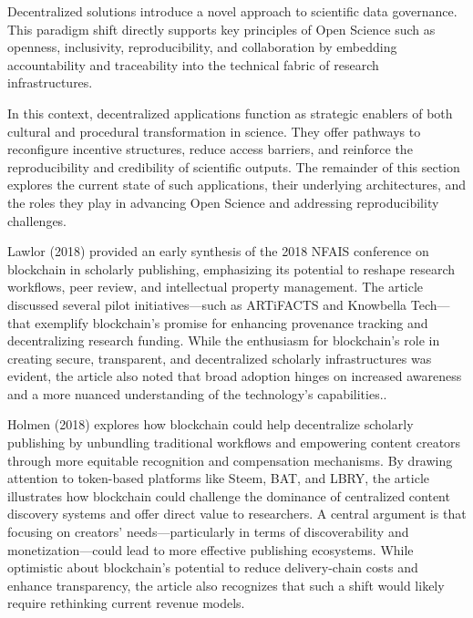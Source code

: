 \documentclass{article}
\begin{document}
Decentralized solutions introduce a novel approach to scientific data governance. This paradigm shift directly supports key principles of Open Science such as openness, inclusivity, reproducibility, and collaboration by embedding accountability and traceability into the technical fabric of research infrastructures.

In this context, decentralized applications function as strategic enablers of both cultural and procedural transformation in science. They offer pathways to reconfigure incentive structures, reduce access barriers, and reinforce the reproducibility and credibility of scientific outputs. The remainder of this section explores the current state of such applications, their underlying architectures, and the roles they play in advancing Open Science and addressing reproducibility challenges.


Lawlor (2018) provided an early synthesis of the 2018 NFAIS conference on blockchain in scholarly publishing, emphasizing its potential to reshape research workflows, peer review, and intellectual property management. The article discussed several pilot initiatives—such as ARTiFACTS and Knowbella Tech—that exemplify blockchain’s promise for enhancing provenance tracking and decentralizing research funding. While the enthusiasm for blockchain's role in creating secure, transparent, and decentralized scholarly infrastructures was evident, the article also noted that broad adoption hinges on increased awareness and a more nuanced understanding of the technology's capabilities..


Holmen (2018) explores how blockchain could help decentralize scholarly publishing by unbundling traditional workflows and empowering content creators through more equitable recognition and compensation mechanisms. By drawing attention to token-based platforms like Steem, BAT, and LBRY, the article illustrates how blockchain could challenge the dominance of centralized content discovery systems and offer direct value to researchers. A central argument is that focusing on creators' needs—particularly in terms of discoverability and monetization—could lead to more effective publishing ecosystems. While optimistic about blockchain’s potential to reduce delivery-chain costs and enhance transparency, the article also recognizes that such a shift would likely require rethinking current revenue models.
\end{document}
